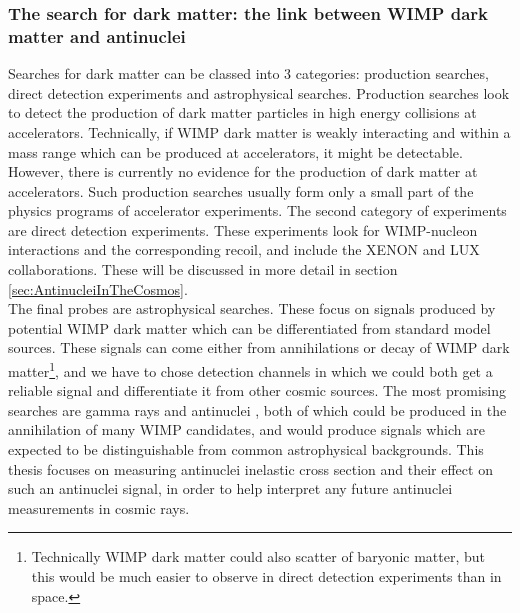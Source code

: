 \subsubsection{The search for dark matter: the link between WIMP dark matter and antinuclei}
Searches for dark matter can be classed into 3 categories: production searches, direct detection experiments and astrophysical searches. Production searches look to detect the production of dark matter particles in high energy collisions at accelerators. Technically, if WIMP dark matter is weakly interacting and within a mass range which can be produced at accelerators, it might be detectable. However, there is currently no evidence for the production of dark matter at accelerators. Such production searches usually form only a small part of the physics programs of accelerator experiments. The second category of experiments are direct detection experiments. These experiments look for WIMP-nucleon interactions and the corresponding recoil, and include the XENON \cite{XENON_new_physics, XENON2} and LUX collaborations\cite{Lux}. These will be discussed in more detail in section \ref{sec:AntinucleiInTheCosmos}.\\

The final probes are astrophysical searches. These focus on signals produced by potential WIMP dark matter which can be differentiated from standard model sources. These signals can come either from annihilations or decay of WIMP dark matter\footnote{Technically WIMP dark matter could also scatter of baryonic matter, but this would be much easier to observe in direct detection experiments than in space.}, and we have to chose detection channels in which we could both get a reliable signal and differentiate it from other cosmic sources. The most promising searches are gamma rays and antinuclei \cite{Conrad2017}, both of which could be produced in the annihilation of many WIMP candidates, and would produce signals which are expected to be distinguishable from common astrophysical backgrounds. This thesis focuses on measuring antinuclei inelastic cross section and their effect on such an antinuclei signal, in order to help interpret any future antinuclei measurements in cosmic rays.


%